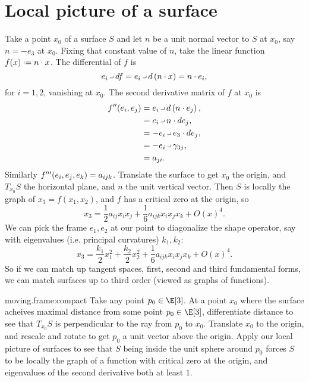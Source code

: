 \section{Local picture of a surface}
Take a point \(x_0\) of a surface \(S\) and let \(n\) be a unit normal vector to \(S\) at \(x_0\), say \(n=-e_3\) at \(x_0\).
Fixing that constant value of \(n\), take the linear function \(f(x) \defeq n\cdot x\).
The differential of \(f\) is
\[
e_i \hook df = e_i \hook d\pr{n \cdot x} = n \cdot e_i,
\]
for \(i=1,2\), vanishing at \(x_0\).
The second derivative matrix of \(f\) at \(x_0\) is
\begin{align*}
f''\of{e_i,e_j}
&=
e_i \hook d\pr{n \cdot e_j},
\\
&=
e_i \hook n \cdot de_j,
\\
&=
-e_i \hook e_3 \cdot de_j,
\\
&=
-e_i \hook \gamma_{3j},
\\
&=
a_{ji}.
\end{align*}
Similarly \(f'''\!\left(e_i,e_j,e_k\right)=a_{ijk}\).
Translate the surface to get \(x_0\) the origin, and \(T_{x_0} S\) the horizontal plane, and \(n\) the unit vertical vector.
Then \(S\) is locally the graph of \(x_3=f(x_1,x_2)\), and \(f\) has a critical zero at the origin, so
\[
x_3=\frac{1}{2}a_{ij}x_ix_j+\frac{1}{6}a_{ijk}x_ix_jx_k+O(x)^4.
\]
We can pick the frame \(e_1,e_2\) at our point to diagonalize the shape operator, say with eigenvalues (i.e. principal curvatures) \(k_1,k_2\):
\[
x_3=\frac{k_1}{2}x_1^2+\frac{k_2}{2}x_2^2+\frac{1}{6}a_{ijk}x_ix_jx_k+O(x)^4.
\]
So if we can match up tangent spaces, first, second and third fundamental forms, we can match surfaces up to third order (viewed as graphs of functions).
\begin{answer}{moving.frame:compact}
Take any point \(p_0 \in \E[3]\).
At a point \(x_0\) where the surface acheives maximal distance from some point \(p_0\in\E[3]\), differentiate distance to see that \(T_{x_0} S\)  is perpendicular to the ray from \(p_0\) to \(x_0\).
Translate \(x_0\) to the origin, and rescale and rotate to get \(p_0\) a unit vector above the origin.
Apply our local picture of surfaces to see that \(S\) being inside the unit sphere around \(p_0\) forces \(S\) to be locally the graph of a function with critical zero at the origin, and eigenvalues of the second derivative both at least \(1\).
\end{answer}

